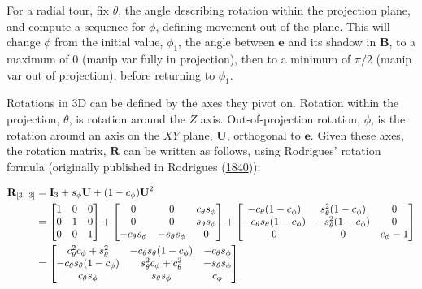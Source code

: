 For a radial tour, fix \(\theta\), the angle describing rotation within
the projection plane, and compute a sequence for \(\phi\), defining
movement out of the plane. This will change \(\phi\) from the initial
value, \(\phi_1\), the angle between \(\textbf{e}\) and its shadow in
\(\textbf{B}\), to a maximum of \(0\) (manip var fully in projection),
then to a minimum of \(\pi/2\) (manip var out of projection), before
returning to \(\phi_1\).

Rotations in 3D can be defined by the axes they pivot on. Rotation
within the projection, \(\theta\), is rotation around the \(Z\) axis.
Out-of-projection rotation, \(\phi\), is the rotation around an axis on
the \(XY\) plane, \(\textbf{U}\), orthogonal to \(\textbf{e}\). Given
these axes, the rotation matrix, \(\textbf{R}\) can be written as
follows, using Rodrigues' rotation formula (originally published in
Rodrigues (\protect\hyperlink{ref-rodrigues_lois_1840}{1840})):

\begin{align*}
    \textbf{R}_{[3,~3]} 
    &= \textbf{I}_3 + s_\phi\*\textbf{U} + (1-c_\phi)\*\textbf{U}^2 \\
        &=
    \begin{bmatrix}
      1 & 0 & 0 \\ 
      0 & 1 & 0 \\ 
      0 & 0 & 1 \\
    \end{bmatrix} +
    \begin{bmatrix}
      0 & 0 & c_\theta s_\phi \\
      0 & 0 & s_\theta s_\phi \\
      -c_\theta s_\phi & -s_\theta s_\phi & 0 \\
    \end{bmatrix} +
    \begin{bmatrix}
      -c_\theta (1-c_\phi) & s^2_\theta (1-c_\phi) & 0 \\
      -c_\theta s_\theta (1-c_\phi) & -s^2_\theta (1-c_\phi) & 0 \\
      0 & 0 & c_\phi-1 \\
    \end{bmatrix} \\
    &= 
    \begin{bmatrix}
      c_\theta^2 c_\phi + s_\theta^2 &
      -c_\theta s_\theta (1 - c_\phi) &
      -c_\theta s_\phi \\
      -c_\theta s_\theta (1 - c_\phi) &
      s_\theta^2 c_\phi + c_\theta^2 &
      -s_\theta s_\phi \\
      c_\theta s_\phi &
      s_\theta s_\phi &
      c_\phi
    \end{bmatrix} \\
\end{align*}

